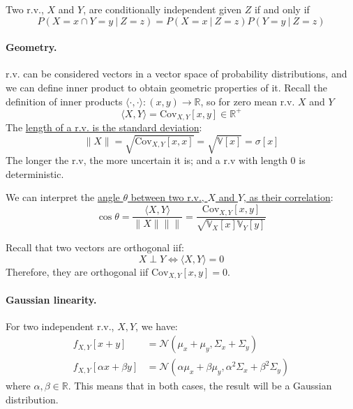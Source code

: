 \documentclass{article}
\begin{document}
\begin{definition}
    Two r.v., $X$ and $Y$, are conditionally independent given $Z$ if and only
    if 
    $$P(X=x\cap Y=y\ |\ Z=z)=P(X=x\ |\ Z=z)P(Y=y\ |\ Z=z)$$
\end{definition}
\paragraph{Geometry.}r.v. can be considered vectors in a vector space of
probability distributions, and we can define inner product to obtain geometric
properties of it. Recall the definition of inner products
$\langle\cdot,\cdot\rangle:(x,y)\to \mathbb{R}$, so for zero mean r.v. $X$ and
$Y$
$$\langle X,Y\rangle=\text{Cov}_{X,Y}[x,y]\in \mathbb{R}^+$$
The \underline{length of a r.v. is the standard deviation}:
$$\lVert X\rVert=\sqrt{\text{Cov}_{X,Y}[x,x]}=\sqrt{\mathbb{V}[x]}=\sigma[x]$$
The longer the r.v, the more uncertain it is; and a r.v with length 0 is
deterministic.

We can interpret the \underline{angle $\theta$ between two r.v., $X$ and $Y$,
as their correlation}:
$$\cos\theta=\frac{\langle X,Y\rangle}{\lVert X\rVert \lVert
\rVert}=\frac{\text{Cov}_{X,Y}[x,y]}{\sqrt{\mathbb{V}_X[x]\mathbb{V}_Y[y]}}$$

Recall that two vectors are orthogonal iif:
$$X\perp Y\iff\langle X,Y\rangle=0$$
Therefore, they are orthogonal iif $\text{Cov}_{X,Y}[x,y]=0$.
\paragraph{Gaussian linearity.}
For two independent r.v., $X,Y$, we have:
$$
\begin{aligned}
    f_{X,Y}[x+y]&=\mathcal{N}(\mu_x+\mu_y,\Sigma_x+\Sigma_y) \\
    f_{X,Y}[\alpha x+\beta y]&=\mathcal{N}(\alpha\mu_x+\beta\mu_y,\alpha^2\Sigma_x+\beta^2\Sigma_y) 
\end{aligned}
$$
where $\alpha,\beta\in \mathbb{R}$. This means that in both cases, the result
will be a Gaussian distribution.
\cleardoublepage
\end{document}
